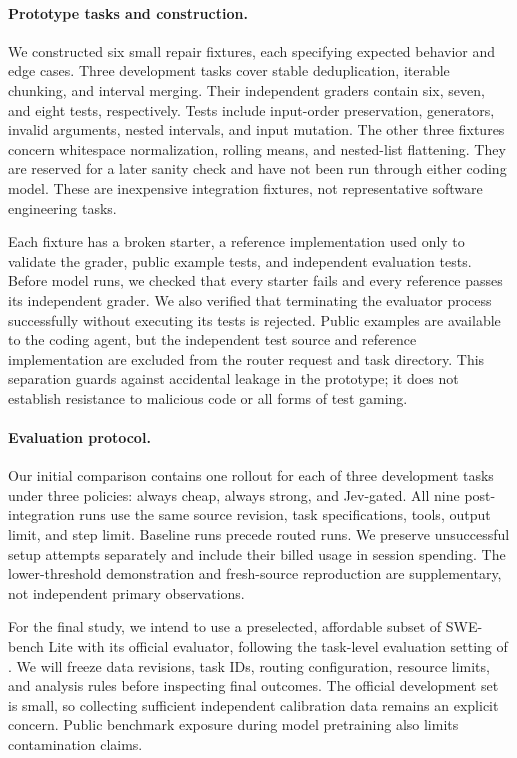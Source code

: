\documentclass{article}
\begin{document}
\paragraph{Prototype tasks and construction.}
We constructed six small repair fixtures, each specifying expected behavior and edge cases. Three development tasks cover stable deduplication, iterable chunking, and interval merging. Their independent graders contain six, seven, and eight tests, respectively. Tests include input-order preservation, generators, invalid arguments, nested intervals, and input mutation. The other three fixtures concern whitespace normalization, rolling means, and nested-list flattening. They are reserved for a later sanity check and have not been run through either coding model. These are inexpensive integration fixtures, not representative software engineering tasks.

Each fixture has a broken starter, a reference implementation used only to validate the grader, public example tests, and independent evaluation tests. Before model runs, we checked that every starter fails and every reference passes its independent grader. We also verified that terminating the evaluator process successfully without executing its tests is rejected. Public examples are available to the coding agent, but the independent test source and reference implementation are excluded from the router request and task directory. This separation guards against accidental leakage in the prototype; it does not establish resistance to malicious code or all forms of test gaming.

\paragraph{Evaluation protocol.}
Our initial comparison contains one rollout for each of three development tasks under three policies: always cheap, always strong, and Jev-gated. All nine post-integration runs use the same source revision, task specifications, tools, output limit, and step limit. Baseline runs precede routed runs. We preserve unsuccessful setup attempts separately and include their billed usage in session spending. The lower-threshold demonstration and fresh-source reproduction are supplementary, not independent primary observations.

For the final study, we intend to use a preselected, affordable subset of SWE-bench Lite with its official evaluator, following the task-level evaluation setting of \citet{jimenez2024}. We will freeze data revisions, task IDs, routing configuration, resource limits, and analysis rules before inspecting final outcomes. The official development set is small, so collecting sufficient independent calibration data remains an explicit concern. Public benchmark exposure during model pretraining also limits contamination claims.
\end{document}
